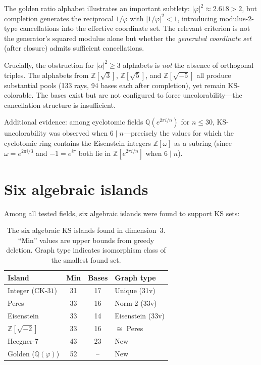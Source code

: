 \documentclass[twocolumn,prl,superscriptaddress,nofootinbib]{revtex4-2}
\newcommand{\Z}{\mathbb{Z}}
\newcommand{\Q}{\mathbb{Q}}
\newcommand{\CK}{\mathrm{CK}\text{-}31}
\begin{document}
The golden ratio alphabet illustrates an important subtlety: $|\varphi|^2 \approx 2.618 > 2$, but completion generates the reciprocal $1/\varphi$ with $|1/\varphi|^2 < 1$, introducing modulus-2-type cancellations into the effective coordinate set. The relevant criterion is not the generator's squared modulus alone but whether the \emph{generated coordinate set} (after closure) admits sufficient cancellations.

Crucially, the obstruction for $|\alpha|^2 \geq 3$ alphabets is \emph{not} the absence of orthogonal triples. The alphabets from $\Z[\sqrt{3}]$, $\Z[\sqrt{5}]$, and $\Z[\sqrt{-5}]$ all produce substantial pools (133 rays, 94 bases each after completion), yet remain KS-colorable. The bases exist but are not configured to force uncolorability---the cancellation structure is insufficient.

Additional evidence: among cyclotomic fields $\Q(e^{2\pi i/n})$ for $n \leq 30$, KS-uncolorability was observed when $6 \mid n$---precisely the values for which the cyclotomic ring contains the Eisenstein integers $\Z[\omega]$ as a subring (since $\omega = e^{2\pi i/3}$ and $-1 = e^{i\pi}$ both lie in $\Z[e^{2\pi i/n}]$ when $6 \mid n$).

\section{Six algebraic islands}

Among all tested fields, six algebraic islands were found to support KS sets:

\begin{table}[t]
\centering
\caption{The six algebraic KS islands found in dimension~3. ``Min'' values are upper bounds from greedy deletion. Graph type indicates isomorphism class of the smallest found set.}
\label{tab:islands}
\begin{tabular}{lccl}
\toprule
Island & Min & Bases & Graph type \\
\midrule
Integer ($\CK$) & 31 & 17 & Unique (31v) \\
Peres & 33 & 16 & Norm-2 (33v) \\
Eisenstein & 33 & 14 & Eisenstein (33v) \\
$\Z[\sqrt{-2}]$ & 33 & 16 & $\cong$ Peres \\
Heegner-7 & 43 & 23 & New \\
Golden ($\Q(\varphi)$) & 52 & -- & New \\
\bottomrule
\end{tabular}
\end{table}
\end{document}
